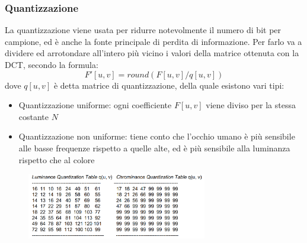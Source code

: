 \documentclass[a4paper,11pt]{article} %
\begin{document}
\subsubsection{Quantizzazione}
La quantizzazione viene usata per ridurre notevolmente il numero di bit per campione, ed è anche la fonte principale di perdita di informazione.
Per farlo va a dividere ed arrotondare all'intero più vicino i valori della matrice ottenuta con la DCT, secondo la formula: 
$$F'[u,v]=round(F[u,v]/ q[u,v])$$
dove $q[u,v]$ è detta matrice di quantizzazione, della quale esistono vari tipi:
\begin{itemize}
\item Quantizzazione uniforme: ogni coefficiente $F[u,v]$ viene diviso per la stessa costante $N$
\item Quantizzazione non uniforme: tiene conto che l'occhio umano è più sensibile alle basse frequenze rispetto a quelle alte, ed è più sensibile alla luminanza rispetto che al colore
\end{itemize}
\begin{figure} [h]
\centering
\includegraphics[width=0.7\textwidth]{Quantization tables}
\end{figure}
\end{document}
